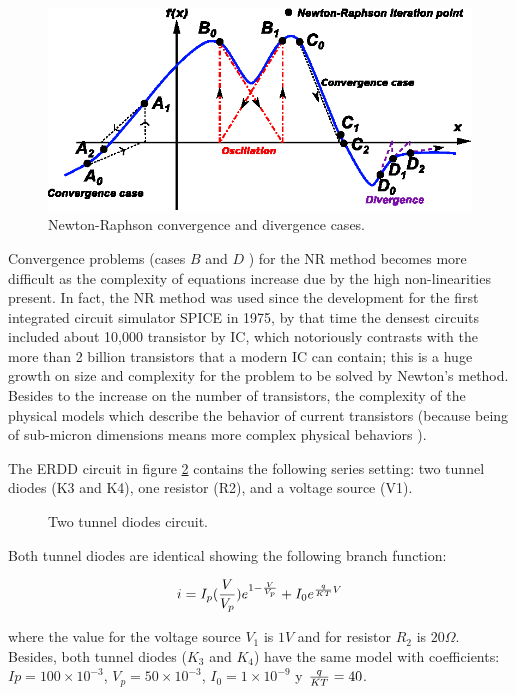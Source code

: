 \documentclass[conference,letterpaper,onecolumn]{IEEEtran}
\begin{document}
\begin{figure}[hbtp]
\centering
\includegraphics[scale=1.3]{figs/divergencia.eps}
\caption{Newton-Raphson convergence and divergence cases.}
\label{NRG}
\end{figure}

Convergence problems (cases $B$ and $D$ ) for the NR method becomes more difficult as the complexity of equations increase due by the high non-linearities present. In fact, the NR method was used since the development for the first integrated circuit simulator SPICE \cite{homo_hspice} in 1975, by that time the densest circuits included about 10,000 transistor by IC, which notoriously contrasts with the more than 2 billion transistors \cite{lmoore} that a modern IC can contain; this is a huge growth on size and complexity for the problem to be solved by Newton's method. Besides to the increase on the number of transistors, the complexity of the  physical models which describe the behavior of current transistors (because being of sub-micron dimensions means more complex physical behaviors \cite{homo_BSIM}).

The ERDD circuit in figure \ref{2tunelx} contains the following series setting: two tunnel diodes (K3 and K4), one resistor (R2), and a voltage source (V1).
 
\begin{figure}[hbtp]
\centerline{
\epsfxsize=70mm 
}
\caption{Two tunnel diodes circuit.}
\label{2tunelx}  
\end{figure}

Both tunnel diodes are identical showing the following branch function:

\begin{displaymath}
i=I_p({V \over V_p})e^{1-{V \over V_p}}+I_0e^{{q \over {KT}} V}
\end{displaymath}

where the value for the voltage source $V_1$ is $1V$ and for resistor $R_2$ is $20\Omega$. Besides, both tunnel diodes ($K_3$ and $K_4$) have the same model with coefficients:
$Ip=100 \times 10^{-3}$,
$V_p=50 \times 10^{-3} $, $I_0=1\times 10^{-9}$ y ${q \over {KT}} = 40$. 
\end{document}
